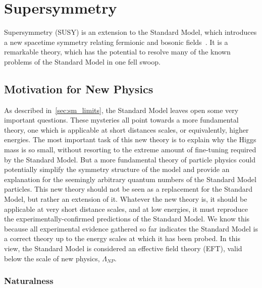 \chapter{Supersymmetry} \label{ch:susy}

Supersymmetry (SUSY) is an extension to the Standard Model, which introduces a new spacetime symmetry relating fermionic and bosonic fields~\cite{sm-pdg-dark-matter}.
It is a remarkable theory, which has the potential to resolve many of the known problems of the Standard Model in one fell swoop.

\section{Motivation for New Physics}\label{sec:susy_motivation}

As described in~\ref{sec:sm_limits}, the Standard Model leaves open some very important questions.
These mysteries all point towards a more fundamental theory, one which is applicable at short distances scales, or equivalently, higher energies.
The most important task of this new theory is to explain why the Higgs mass is so small, without resorting to the extreme amount of fine-tuning required by the Standard Model.
But a more fundamental theory of particle physics could potentially simplify the symmetry structure of the model and provide an explanation for the seemingly arbitrary quantum numbers of the Standard Model particles.
This new theory should not be seen as a replacement for the Standard Model, but rather an extension of it.
Whatever the new theory is, it should be applicable at very short distance scales, and at low energies, it must reproduce the experimentally-confirmed predictions of the Standard Model.
We know this because all experimental evidence gathered so far indicates the Standard Model is a correct theory up to the energy scales at which it has been probed.
In this view, the Standard Model is considered an effective field theory (EFT), valid below the scale of new physics, $\Lambda_{NP}$.

\subsection{Naturalness}\label{subsec:susy_naturalness}

